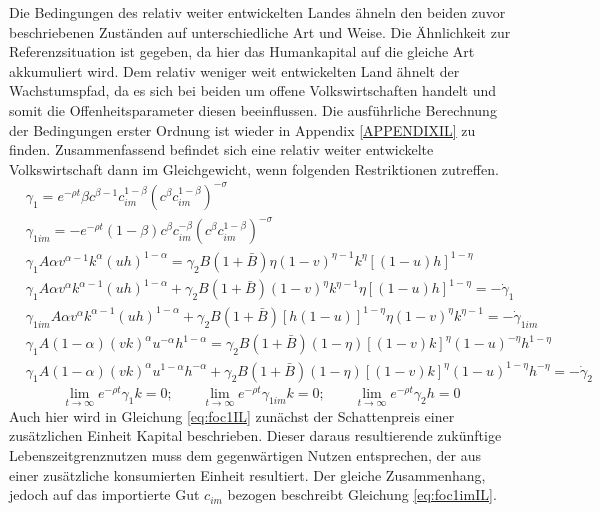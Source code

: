 %
Die Bedingungen des relativ weiter entwickelten Landes ähneln den beiden zuvor beschriebenen Zuständen auf unterschiedliche Art und Weise. Die Ähnlichkeit zur Referenzsituation ist gegeben, da hier das Humankapital auf die gleiche Art akkumuliert wird. Dem relativ weniger weit entwickelten Land ähnelt der Wachstumspfad, da es sich bei beiden um offene Volkswirtschaften handelt und somit die Offenheitsparameter diesen beeinflussen. Die ausführliche Berechnung der Bedingungen erster Ordnung ist wieder in Appendix \ref{APPENDIXIL} zu finden. Zusammenfassend befindet sich eine relativ weiter entwickelte Volkswirtschaft dann im Gleichgewicht, wenn folgenden Restriktionen zutreffen.
%
\begin{align}
	&\gamma_1=e^{-\rho t}\beta c^{\beta-1}c_{im}^{1-\beta}(c^\beta c_{im}^{1-\beta})^{-\sigma}\label{eq:foc1IL}\\
	&\gamma_{1im}=-e^{-\rho t}(1-\beta) c^{\beta}c_{im}^{-\beta}(c^\beta c_{im}^{1-\beta})^{-\sigma}\label{eq:foc1imIL}\\
	&\gamma_1A\alpha v^{\alpha-1}k^\alpha(uh)^{1-\alpha}=\gamma_2B(1+\bar{B})\eta(1-v)^{\eta-1}k^\eta[(1-u)h]^{1-\eta}\label{eq:foc2IL}\\
	&\gamma_{1}A\alpha v^{\alpha} k^{\alpha -1} (u h)^{1- \alpha} + \gamma_{2}B(1+\bar{B})(1- v)^{\eta} k^{\eta -1} \eta \left [ (1-u)h \right ]^{1- \eta}= - \dot{\gamma}_{1}\label{eq:foc3IL}\\
	&\gamma_{1 im}A\alpha v^{\alpha}k^{\alpha -1}(uh)^{1- \alpha}+ \gamma_{2}B(1+\bar{B}) [h(1-u)]^{1- \eta} \eta(1-v)^{\eta}k^{\eta -1}= - \dot{\gamma}_{1im}\label{eq:foc3imIL}\\
	&\gamma_1A(1-\alpha)(vk)^{\alpha}u^{-\alpha}h^{1-\alpha}=\gamma_2B(1+\bar{B})(1-\eta)[(1-v)k]^\eta (1-u)^{-\eta} h^{1-\eta}\label{eq:foc4IL}\\
	&\gamma_1A(1-\alpha)(vk)^\alpha u^{1-\alpha}h^{-\alpha}+\gamma_2 B(1+\bar{B})(1-\eta)[(1-v)k]^{\eta}(1-u)^{1-\eta}h^{-\eta}=-\dot{\gamma}_2\label{eq:foc5IL}
\end{align}
%
\vspace{-0.6cm}
%
\begin{equation}
	\lim_{t \to \infty}e^{-\rho t}\gamma_1k=0;\qquad \lim_{t \to \infty}e^{-\rho t}\gamma_{1im}k=0; \qquad \lim_{t \to \infty}e^{-\rho t}\gamma_2h=0
\end{equation}
%
Auch hier wird in Gleichung \eqref{eq:foc1IL} zunächst der Schattenpreis einer zusätzlichen Einheit Kapital beschrieben. Dieser daraus resultierende zukünftige Lebenszeitgrenznutzen muss dem gegenwärtigen Nutzen entsprechen, der aus einer zusätzliche konsumierten Einheit resultiert. Der gleiche Zusammenhang, jedoch auf das importierte Gut $c_{im}$ bezogen beschreibt Gleichung \eqref{eq:foc1imIL}.\\
